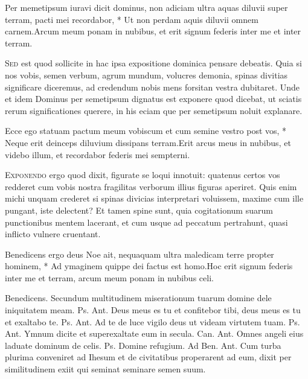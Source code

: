 \begin{multicols*}{2}
\begin{responsory}
{Per memetipsum iuravi dicit dominus, non adiciam ultra aquas diluvii super terram, pacti mei recordabor, * Ut non perdam aquis diluvii omnem carnem.}{Arcum meum ponam in nubibus, et erit signum federis inter me et inter terram.}
\end{responsory}
\lettrine[lines=2]{\zallmancaps \color{Blue} S}{ed} est quod sollicite in hac ipsa expositione dominica pensare debeatis. Quia si nos vobis, semen verbum, agrum mundum, volucres demonia, spinas divitias significare diceremus, ad credendum nobis mens forsitan vestra dubitaret. Unde et idem Dominus per semetipsum dignatus est exponere quod dicebat, ut sciatis rerum significationes querere, in his eciam que per semetipsum noluit explanare.
\begin{responsory}
{Ecce ego statuam pactum meum vobiscum et cum semine vestro post vos, * Neque erit deinceps diluvium dissipans terram.}{Erit arcus meus in nubibus, et videbo illum, et recordabor federis mei sempterni.}
\end{responsory}
\lettrine[lines=2]{\zallmancaps \color{Red} E}{xponendo} ergo quod dixit, figurate se loqui innotuit: quatenus certos vos redderet cum vobis nostra fragilitas verborum illius figuras aperiret. Quis enim michi unquam crederet si spinas divicias interpretari voluissem, maxime cum ille pungant, iste delectent? Et tamen spine sunt, quia cogitationum suarum punctionibus mentem lacerant, et cum usque ad peccatum pertrahunt, quasi inflicto vulnere cruentant.
\begin{responsory-doxology}
{Benedicens ergo deus Noe ait, nequaquam ultra maledicam terre propter hominem, * Ad ymaginem quippe dei factus est homo.}{Hoc erit signum federis inter me et terram, arcum meum ponam in nubibus celi.}
\end{responsory-doxology}
Benedicens.
 Secundum multitudinem miserationum tuarum domine dele iniquitatem meam. {\color{Red} Ps.}  {\color{Red} Ant.} Deus meus es tu et confitebor tibi, deus meus es tu et exaltabo te. {\color{Red} Ps.}  {\color{Red} Ant.} Ad te de luce vigilo deus ut videam virtutem tuam. {\color{Red} Ps.}  {\color{Red} Ant.} Ymnum dicite et superexaltate eum in secula. {\color{Red} Can.}  {\color{Red} Ant.} Omnes angeli eius laduate dominum de celis. {\color{Red} Ps.}  \V Domine refugium. {\color{Red} Ad Ben. Ant.} Cum turba plurima conveniret ad Ihesum et de civitatibus properarent ad eum, dixit per similitudinem exiit qui seminat seminare semen suum.

\end{multicols*}
